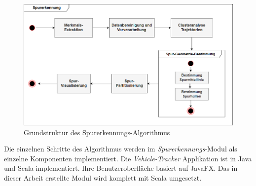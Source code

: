 \begin{figure}[H]
    \centering
    \includegraphics[width=0.8\linewidth]{resources/img/konzeption/activity_laneDetection}
    \caption{Grundstruktur des Spurerkennungs-Algorithmus}
    \label{fig:concept_laneDetection_activity}
\end{figure}

Die einzelnen Schritte des Algorithmus werden im \textit{Spurerkennungs}-Modul als einzelne Komponenten
implementiert.
Die \textit{Vehicle-Tracker} Applikation ist in Java und Scala implementiert. Ihre Benutzeroberfläche basiert
auf JavaFX. Das in dieser Arbeit erstellte Modul wird komplett mit Scala umgesetzt.

